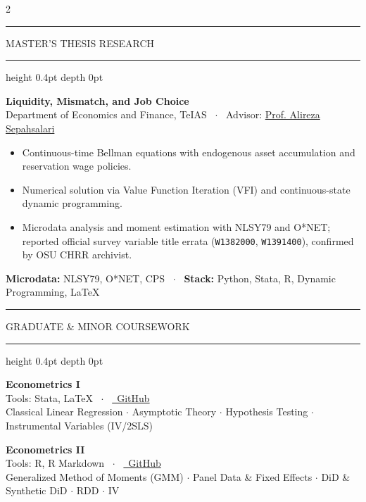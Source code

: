 \documentclass[10pt,a4paper]{article}
\newcommand{\scorebadge}[1]{%
  \tcbox[on line, colback=chipbg, colframe=chipborder, arc=2pt, boxrule=0.45pt, boxsep=0pt, left=3.5pt, right=3.5pt, top=1.2pt, bottom=1.2pt]{%
    \scriptsize\bfseries\color{slate800}#1%
  }%
}
\newcommand{\resumesection}[1]{%
  \vspace{4.5pt}%
  \noindent%
  \begingroup%
  \color{ink}\bfseries\fontsize{9pt}{10.5pt}\selectfont%
  \textcolor{accent}{\rule[-0.5pt]{2.5pt}{9pt}}\hspace{4pt}%
  \MakeUppercase{#1}%
  \hspace{4pt}\leaders\hrule height 0.4pt depth 0pt\hfill\null%
  \endgroup%
  \vspace{2.5pt}%
}
\begin{document}
\begin{paracol}{2}


\resumesection{Master's Thesis Research}

\noindent
\textbf{\fontsize{8.5pt}{10pt}\selectfont Liquidity, Mismatch, and Job Choice} \hfill \scorebadge{Thesis}\\[1.5pt]
{\scriptsize\color{muted} Department of Economics and Finance, TeIAS \ $\cdot$ \ Advisor: \href{https://www.sepahsalari.com/}{Prof. Alireza Sepahsalari}}

\vspace{1.5pt}
\begin{itemize}
  \item Continuous-time Bellman equations with endogenous asset accumulation and reservation wage policies.
  \item Numerical solution via Value Function Iteration (VFI) and continuous-state dynamic programming.
  \item Microdata analysis and moment estimation with NLSY79 and O*NET; reported official survey variable title errata (\texttt{W1382000}, \texttt{W1391400}), confirmed by OSU CHRR archivist.
\end{itemize}

\vspace{1.5pt}
\noindent
{\scriptsize
\textbf{Microdata:} NLSY79, O*NET, CPS \ $\cdot$ \ \textbf{Stack:} Python, Stata, R, Dynamic Programming, LaTeX
}

\resumesection{Graduate \& Minor Coursework}

\noindent
\textbf{Econometrics I} \hfill \scorebadge{19.3 / 20}\\
{\scriptsize\color{muted} Tools: Stata, LaTeX \ $\cdot$ \ \href{https://github.com/AmirrezaFarnamTaheri/Econometrics-I}{\color{accent}\faExternalLink*\ GitHub}}\\
{\scriptsize Classical Linear Regression $\cdot$ Asymptotic Theory $\cdot$ Hypothesis Testing $\cdot$ Instrumental Variables (IV/2SLS)}

\vspace{2.5pt}
\noindent
\textbf{Econometrics II} \hfill \scorebadge{19.0 / 20}\\
{\scriptsize\color{muted} Tools: R, R Markdown \ $\cdot$ \ \href{https://github.com/AmirrezaFarnamTaheri/Metric-II-Homeworks}{\color{accent}\faExternalLink*\ GitHub}}\\
{\scriptsize Generalized Method of Moments (GMM) $\cdot$ Panel Data \& Fixed Effects $\cdot$ DiD \& Synthetic DiD $\cdot$ RDD $\cdot$ IV}


\end{paracol}
\end{document}
